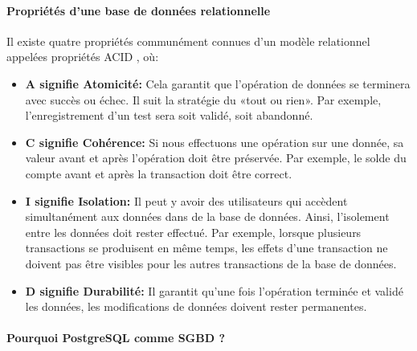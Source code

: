          \paragraph{Propriétés d'une base de données relationnelle}
         Il existe quatre propriétés communément connues d'un modèle relationnel appelées propriétés ACID \cite{typedb}, où:
         \begin{itemize}
                 \item \textbf{A signifie Atomicité: }
                  Cela garantit que l'opération de données se terminera 
                 avec succès ou échec. Il suit la stratégie du «tout ou rien». Par exemple, 
                 l'enregistrement d'un test sera soit validé, soit abandonné.
                 \item \textbf{C signifie Cohérence: }
                  Si nous effectuons une opération sur une donnée, 
                 sa valeur avant et après l'opération doit être préservée. Par exemple, 
                 le solde du compte avant et après la transaction doit être correct.
                 \item \textbf{I signifie Isolation: }
                 Il peut y avoir des utilisateurs  
                 qui accèdent simultanément aux données dans de la base de données. 
                 Ainsi, l'isolement entre les données doit rester effectué. Par exemple, 
                 lorsque plusieurs transactions se produisent en même temps, les effets 
                 d'une transaction ne doivent pas être visibles pour les autres 
                 transactions de la base de données.
                 \item \textbf{D signifie Durabilité: }
                 Il garantit qu'une fois l'opération terminée et validé les données, 
                 les modifications de données doivent rester permanentes.

         \end{itemize}
         \paragraph{Pourquoi PostgreSQL comme SGBD ?}
